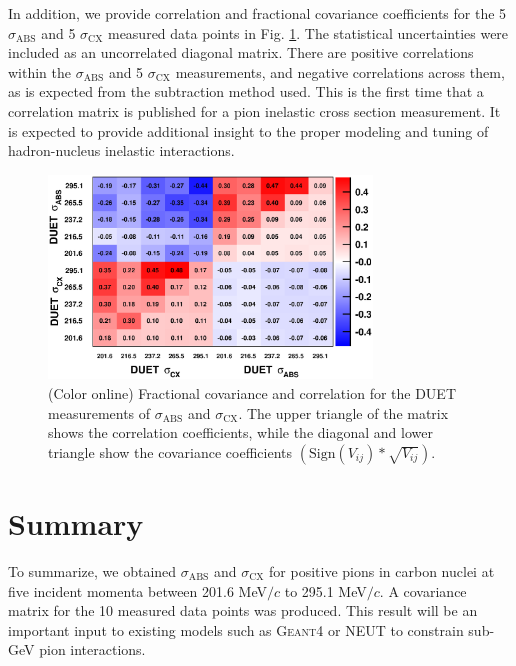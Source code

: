 In addition, we provide correlation and fractional covariance coefficients for the 5 $\sigma_{\mathrm{ABS}}$ and 5 $\sigma_{\mathrm{CX}}$ measured data points in Fig. \ref{fig:covariance}. The statistical uncertainties were included as an uncorrelated diagonal matrix. There are positive correlations within the $\sigma_{\mathrm{ABS}}$ and 5 $\sigma_{\mathrm{CX}}$ measurements, and negative correlations across them, as is expected from the subtraction method used. This is the first time that a correlation matrix is published for a pion inelastic cross section measurement. It is expected to provide additional insight to the proper modeling and tuning of hadron-nucleus inelastic interactions.

\begin{figure}[h]
\begin{center}
\includegraphics[width=86mm]{figures/duet_fractional_covariance_and_correlation_forpaper.eps}
\caption{(Color online) Fractional covariance and correlation for the DUET measurements of $\sigma_{\mathrm{ABS}}$ and $\sigma_{\mathrm{CX}}$. {\color{red} The upper triangle of the matrix shows the correlation coefficients, while the diagonal and lower triangle show the covariance coefficients $(\mathrm{Sign}(V_{ij})*\sqrt{V_{ij}})$.}}
\label{fig:covariance}
\end{center} 
\end{figure}

\section{Summary}
To summarize, we obtained $\sigma_{\mathrm{ABS}}$ and $\sigma_{\mathrm{CX}}$ for positive pions in carbon nuclei at five incident momenta between 201.6 MeV$/c$ to 295.1 MeV$/c$. A covariance matrix for the 10 measured data points was produced. This result will be an important input to existing models such as \textsc{Geant4} or \textsc{NEUT} to constrain sub-GeV pion interactions.
